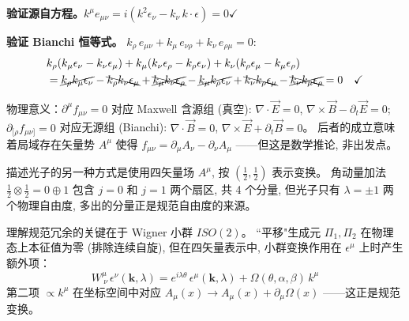 \textbf{验证源自方程。}$k^\mu e_{\mu\nu} = i(k^2\epsilon_\nu - k_\nu\,k\cdot\epsilon) = 0$\;$\checkmark$

\textbf{验证 Bianchi 恒等式。}
$k_\rho\,e_{\mu\nu}+k_\mu\,e_{\nu\rho}+k_\nu\,e_{\rho\mu}=0$:
\begin{align}
    &k_\rho(k_\mu\epsilon_\nu - k_\nu\epsilon_\mu)
    + k_\mu(k_\nu\epsilon_\rho - k_\rho\epsilon_\nu)
    + k_\nu(k_\rho\epsilon_\mu - k_\mu\epsilon_\rho) \nonumber\\
    &= \cancel{k_\rho k_\mu\epsilon_\nu} - \bcancel{k_\rho k_\nu\epsilon_\mu}
    + \xcancel{k_\mu k_\nu\epsilon_\rho} - \cancel{k_\mu k_\rho\epsilon_\nu}
    + \bcancel{k_\nu k_\rho\epsilon_\mu} - \xcancel{k_\nu k_\mu\epsilon_\rho}
    = 0 \quad\checkmark
\end{align}

物理意义：$\partial^\mu f_{\mu\nu}=0$ 对应 Maxwell 含源组 (真空):
$\nabla\cdot\vec{E}=0$, $\nabla\times\vec{B}-\partial_t\vec{E}=0$;
$\partial_{[\rho}f_{\mu\nu]}=0$ 对应无源组 (Bianchi):
$\nabla\cdot\vec{B}=0$, $\nabla\times\vec{E}+\partial_t\vec{B}=0$。
后者的成立意味着局域存在矢量势 $A^\mu$ 使得 $f_{\mu\nu}=\partial_\mu A_\nu - \partial_\nu A_\mu$
——但这是数学推论, 非出发点。



描述光子的另一种方式是使用四矢量场 $A^\mu$, 按 $(\frac{1}{2},\frac{1}{2})$ 表示变换。
角动量加法 $\frac{1}{2}\otimes\frac{1}{2}=0\oplus 1$ 包含 $j=0$ 和 $j=1$ 两个扇区,
共 4 个分量, 但光子只有 $\lambda=\pm 1$ 两个物理自由度,
多出的分量正是规范自由度的来源。

理解规范冗余的关键在于 Wigner 小群 $ISO(2)$。
``平移"生成元 $\Pi_1,\Pi_2$ 在物理态上本征值为零 (排除连续自旋),
但在四矢量表示中, 小群变换作用在 $\epsilon^\mu$ 上时产生额外项：
\begin{equation}
    W^\mu_{\ \nu}\,\epsilon^\nu(\mathbf{k},\lambda) =
    e^{i\lambda\theta}\,\epsilon^\mu(\mathbf{k},\lambda) + \Omega(\theta,\alpha,\beta)\,k^\mu
\end{equation}
第二项 $\propto k^\mu$ 在坐标空间中对应 $A_\mu(x)\to A_\mu(x)+\partial_\mu\Omega(x)$
——这正是规范变换。

\begin{center}
\end{center}


